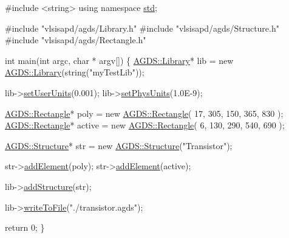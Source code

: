 \begin{DoxyCodeInclude}
\textcolor{preprocessor}{#include <string>}
\textcolor{keyword}{using namespace }\mbox{\hyperlink{namespacestd}{std}};

\textcolor{preprocessor}{#include "vlsisapd/agds/Library.h"}
\textcolor{preprocessor}{#include "vlsisapd/agds/Structure.h"}
\textcolor{preprocessor}{#include "vlsisapd/agds/Rectangle.h"}

\textcolor{keywordtype}{int} main(\textcolor{keywordtype}{int} argc, \textcolor{keywordtype}{char} * argv[]) \{
    \mbox{\hyperlink{class_a_g_d_s_1_1_library}{AGDS::Library}}* lib = \textcolor{keyword}{new} \mbox{\hyperlink{class_a_g_d_s_1_1_library}{AGDS::Library}}(\textcolor{keywordtype}{string}(\textcolor{stringliteral}{"myTestLib"}));

    lib->\mbox{\hyperlink{class_a_g_d_s_1_1_library_a0d0e972bb142f892c462bb8d7f04a50b}{setUserUnits}}(0.001);
    lib->\mbox{\hyperlink{class_a_g_d_s_1_1_library_a938acb6eb8d14aade9dba7331c75ff0a}{setPhysUnits}}(1.0E-9);

    \mbox{\hyperlink{class_a_g_d_s_1_1_rectangle}{AGDS::Rectangle}}* poly   = \textcolor{keyword}{new} \mbox{\hyperlink{class_a_g_d_s_1_1_rectangle}{AGDS::Rectangle}}( 17, 305, 150, 365, 830 );
    \mbox{\hyperlink{class_a_g_d_s_1_1_rectangle}{AGDS::Rectangle}}* active = \textcolor{keyword}{new} \mbox{\hyperlink{class_a_g_d_s_1_1_rectangle}{AGDS::Rectangle}}(  6, 130, 290, 540, 690 );

    \mbox{\hyperlink{class_a_g_d_s_1_1_structure}{AGDS::Structure}}* str = \textcolor{keyword}{new} \mbox{\hyperlink{class_a_g_d_s_1_1_structure}{AGDS::Structure}}(\textcolor{stringliteral}{"Transistor"});

    str->\mbox{\hyperlink{class_a_g_d_s_1_1_structure_a2dd203e6770f7d15d6f706867c919a60}{addElement}}(poly);
    str->\mbox{\hyperlink{class_a_g_d_s_1_1_structure_a2dd203e6770f7d15d6f706867c919a60}{addElement}}(active);

    lib->\mbox{\hyperlink{class_a_g_d_s_1_1_library_a93d333a20154e0b688ff3ff213039171}{addStructure}}(str);

    lib->\mbox{\hyperlink{class_a_g_d_s_1_1_library_a33b9d989b84857f46034085664ff3fa2}{writeToFile}}(\textcolor{stringliteral}{"./transistor.agds"});
    
    \textcolor{keywordflow}{return} 0;
\}

\end{DoxyCodeInclude}


